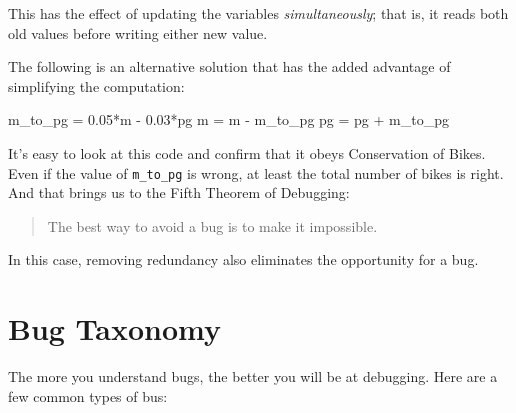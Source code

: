 \documentclass[../../book.tex]{subfiles}
\begin{document}
This has the effect of updating the variables \emph{simultaneously}; that
is, it reads both old values before writing either new value.


The following is an alternative solution that
has the added advantage of simplifying the computation:

\begin{code}
m_to_pg = 0.05*m - 0.03*pg
m = m - m_to_pg
pg = pg + m_to_pg
\end{code}

It's easy to look at this code and confirm that it obeys Conservation
of Bikes.  Even if the value of \lstinline{m_to_pg} is wrong, at least the total
number of bikes is right.  And that brings us to the Fifth Theorem of
Debugging:

\begin{quote}
The best way to avoid a bug is to make it impossible.
\end{quote}

In this case, removing redundancy also eliminates the opportunity for  a bug.

\section{Bug Taxonomy}

The more you understand bugs, the better you will be at debugging. Here are a few common types of bus:

\end{document}
